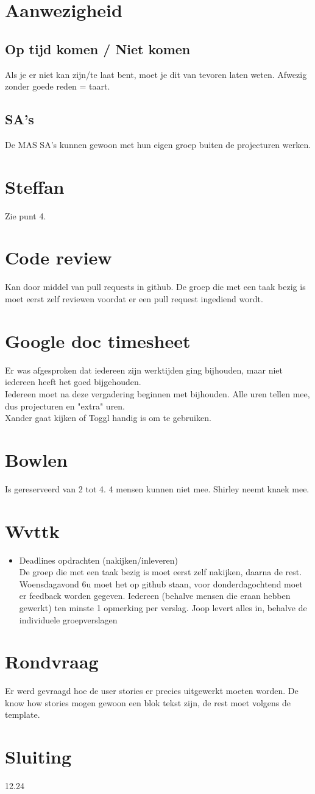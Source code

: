 \documentclass{article}
\begin{document}
\section{Aanwezigheid}
\subsection{Op tijd komen / Niet komen}
Als je er niet kan zijn/te laat bent, moet je dit van tevoren laten weten. Afwezig zonder goede reden = taart.

\subsection{SA's}
De MAS SA's kunnen gewoon met hun eigen groep buiten de projecturen werken.

\section{Steffan}
Zie punt 4.

\section{Code review}
Kan door middel van pull requests in github. De groep die met een taak bezig is moet eerst zelf reviewen voordat er een pull request ingediend wordt.

\section{Google doc timesheet}
Er was afgesproken dat iedereen zijn werktijden ging bijhouden, maar niet iedereen heeft het goed bijgehouden.\\
Iedereen moet na deze vergadering beginnen met bijhouden. Alle uren tellen mee, dus projecturen en "extra" uren.\\
Xander gaat kijken of Toggl handig is om te gebruiken.

\section{Bowlen}
Is gereserveerd van 2 tot 4. 4 mensen kunnen niet mee. Shirley neemt knaek mee.

\section{Wvttk}
\begin{itemize}
\item Deadlines opdrachten (nakijken/inleveren)\\
De groep die met een taak bezig is moet eerst zelf nakijken, daarna de rest.
Woensdagavond 6u moet het op github staan, voor donderdagochtend moet er feedback worden gegeven.
Iedereen (behalve mensen die eraan hebben gewerkt) ten minste 1 opmerking per verslag. Joop levert alles in, behalve de individuele groepverslagen
\end{itemize}

\section{Rondvraag}
Er werd gevraagd hoe de user stories er precies uitgewerkt moeten worden. De know how stories mogen gewoon een blok tekst zijn, de rest moet volgens de template.

\section{Sluiting}
12.24
\end{document}
